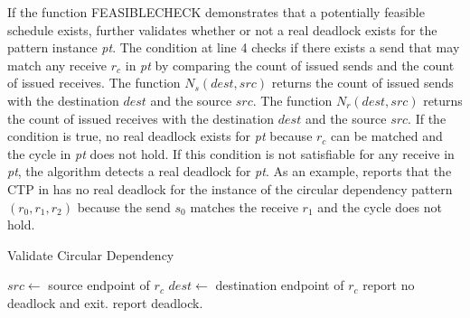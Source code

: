 \examplefigfour


If the function \textrm{FEASIBLECHECK} demonstrates that a potentially feasible schedule exists,  further validates whether or not a real deadlock exists for the pattern instance \textit{pt}. The condition at line 4 checks if there exists a send that may match any receive $\mathit{r_c}$ in \textit{pt} by comparing the count of issued sends and the count of issued receives.    
The function $\mathit{N_s}(\mathit{dest},\mathit{src})$ returns the count of issued sends with the destination $\mathit{dest}$ and the source $\mathit{src}$. The function $\mathit{N_r}(\mathit{dest},\mathit{src})$ returns the count of issued receives with the destination $\mathit{dest}$ and the source $\mathit{src}$.
If the condition is true, no real deadlock exists for \textit{pt} because $\mathit{r_c}$ can be matched and the cycle in \textit{pt} does not hold. If this condition is not satisfiable for any receive in \textit{pt}, the algorithm detects a real deadlock for \textit{pt}.
As an example,  reports that the CTP in  has no real deadlock for the instance of the circular dependency pattern $(r_0,r_1,r_2)$ because the send $s_0$ matches the receive $r_1$ and the cycle does not hold.

\begin{algorithm}
\caption{Validate Circular Dependency}\label{algo:vcircular}
\begin{algorithmic}[1]
\State $\mathit{src} \gets$ source endpoint of $\mathit{r_c}$ 
\State $\mathit{dest} \gets$ destination endpoint of $\mathit{r_c}$
\State report no deadlock and exit.
\EndIf
\EndFor
\State report deadlock.
\end{algorithmic}
\end{algorithm}


